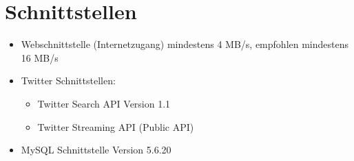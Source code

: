 \section{Schnittstellen}
   \begin{itemize}
   \item Webschnittstelle (Internetzugang) mindestens 4 MB/s, empfohlen mindestens 16 MB/s
	\item Twitter Schnittstellen:
	\begin{itemize}
	\item Twitter Search API Version 1.1
	\item Twitter Streaming API (Public API)
	\end{itemize}
\item MySQL Schnittstelle Version 5.6.20
   \end{itemize}